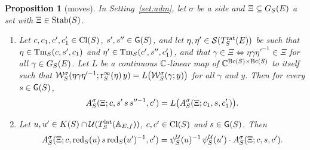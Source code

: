 \documentclass[11pt,a4paper]{article}
\theoremstyle{plainx}
\newtheorem{proposition}[theorem]{Proposition}
\theoremstyle{uprightx}
\begin{document}
\begin{proposition}[moves]\label{p:moves}
In Setting~\ref{set:adm}, let $\sigma$ be a side and $\Xi\subseteq G_{S}(E)$ a set with $\Xi\in\operatorname{Stab}(S)$.
\begin{enumerate}[label=(\alph*),itemsep=1pt]
\item Let $c,c_1,c',c_1'\in\mathrm{Cl}(S)$, $s',s''\in\mathsf{G}(S)$, and let $\eta,\eta'\in\mathcal{S}(T^{\mathrm{rat}}_{S}(E))$ be such that
$\eta\in\mathrm{Tm}_{S}(c,s',c_1)$ and $\eta'\in\mathrm{Tm}_{S}(c',s'',c_1')$, and that
$\gamma\in\Xi\Leftrightarrow\eta\gamma\eta'^{-1}\in\Xi$ for all $\gamma\in G_{S}(E)$. Let $L$ be a continuous $\mathbb{C}$-linear
map of $\mathbb{C}^{\mathrm{Bc}(S)\times\mathrm{Bc}(S)}$ to itself such that
$\mathcal{W}^{\sigma}_{S}(\eta\gamma\eta'^{-1};\mathrm{r}^{\infty}_{S}(\eta)\,y)=L\bigl(\mathcal{W}^{\sigma}_{S}(\gamma;y)\bigr)$ for all $\gamma$ and $y$.
Then for every $s\in\mathsf{G}(S)$,
\[A^{\sigma}_{S}(\Xi;c,s'\,s\,s''^{-1},c')=L\bigl(A^{\sigma}_{S}(\Xi;c_1,s,c_1')\bigr).\]
\item Let $u,u'\in K(S)\cap\mathcal{U}(T^{\mathrm{lat}}_{S}(\mathbb{A}_{E,f}))$, $c,c'\in\mathrm{Cl}(S)$ and $s\in\mathsf{G}(S)$. Then
\[A^{\sigma}_{S}(\Xi;c,\mathrm{red}_{S}(u)\,s\,\mathrm{red}_{S}(u')^{-1},c')=\psi^{\mathcal{U}}_{S}(u)^{-1}\,\psi^{\mathcal{U}}_{S}(u')\cdot A^{\sigma}_{S}(\Xi;c,s,c').\]
\end{enumerate}
\end{proposition}
\end{document}
